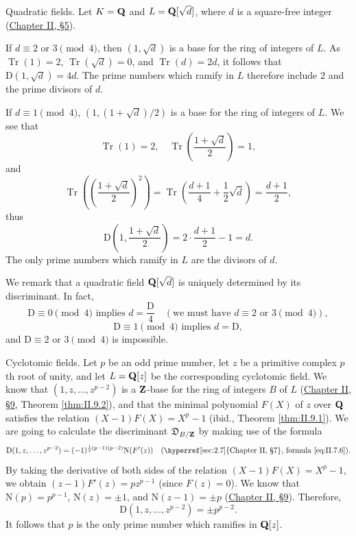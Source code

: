 \begin{example}\label{exa:V.3.1}
Quadratic fields. Let $K=\mathbf{Q}$ and $L=\mathbf{Q}[\sqrt{d}]$, where $d$ is a
square-free integer (\hyperref[sec:2.5]{Chapter II, §5}).
\begin{alist}
\item If $d\equiv2$ or $3\pmod4$, then $(1,\sqrt{d})$ is a base for the
ring of integers of $L$. As $\operatorname{Tr}(1)=2$,
$\operatorname{Tr}(\sqrt{d})=0$, and $\operatorname{Tr}(d)=2d$, it follows
that $\mathrm{D}(1,\sqrt{d})=4d$. The prime numbers which ramify in $L$
therefore include $2$ and the prime divisors of $d$.
\item If $d\equiv1\pmod4$, $(1,(1+\sqrt{d})/2)$ is a base for the ring of
integers of $L$. We see that
\[
\operatorname{Tr}(1)=2,\quad
\operatorname{Tr}\left(\frac{1+\sqrt{d}}{2}\right)=1,
\]
and
\[
\operatorname{Tr}\left(\left(\frac{1+\sqrt{d}}{2}\right)^{2}\right)
=\operatorname{Tr}\left(\frac{d+1}{4}+\frac{1}{2}\sqrt{d}\right)
=\frac{d+1}{2},
\]
thus
\[
\mathrm{D}\left(1,\frac{1+\sqrt{d}}{2}\right)
=2\cdot\frac{d+1}{2}-1=d.
\]
The only prime numbers which ramify in $L$ are the divisors of $d$.
\end{alist}
\end{example}

We remark that a quadratic field $\mathbf{Q}[\sqrt{d}]$ is uniquely determined by its
discriminant. In fact,
\[
\mathrm{D}\equiv0\pmod4 \text{ implies } d=\frac{\mathrm{D}}{4}
\quad(\text{we must have } d\equiv2 \text{ or } 3\pmod4),
\]
\[
\mathrm{D}\equiv1\pmod4 \text{ implies } d=\mathrm{D},
\]
and $\mathrm{D}\equiv2$ or $3\pmod4$ is impossible.

\begin{example}\label{exa:V.3.2}
Cyclotomic fields. Let $p$ be an odd prime number, let $z$ be a
primitive complex $p$th root of unity, and let $L=\mathbf{Q}[z]$ be the
corresponding cyclotomic field. We know that $(1,z,\ldots,z^{p-2})$ is a
$\mathbf{Z}$-base for the ring of integers $B$ of $L$ (\hyperref[sec:2.9]{Chapter II, §9}, Theorem
\ref{thm:II.9.2}), and that the minimal polynomial $F(X)$ of $z$ over $\mathbf{Q}$
satisfies the relation $(X-1)F(X)=X^{p}-1$ (ibid., Theorem
\ref{thm:II.9.1}). We are going to calculate the discriminant
$\mathfrak{D}_{B/\mathbf{Z}}$ by making use of the formula
\[
\mathrm{D}(1,z,\ldots,z^{p-2})=(-1)^{\frac{1}{2}(p-1)(p-2)}
\mathrm{N}(F'(z))\quad(\text{\hyperref[sec:2.7]{Chapter II, §7}, formula
\eqref{eq:II.7.6}}).
\]
By taking the derivative of both sides of the relation $(X-1)F(X)=X^{p}-1$,
we obtain $(z-1)F'(z)=pz^{p-1}$ (since $F(z)=0$). We know that
$\mathrm{N}(p)=p^{p-1}$, $\mathrm{N}(z)=\pm1$, and
$\mathrm{N}(z-1)=\pm p$ (\hyperref[sec:2.9]{Chapter II, §9}). Therefore,
\begin{equation}
\mathrm{D}(1,z,\ldots,z^{p-2})=\pm p^{p-2}.
\label{eq:V.3.1}
\end{equation}
It follows that $p$ is the only prime number which ramifies in $\mathbf{Q}[z]$.
\end{example}

